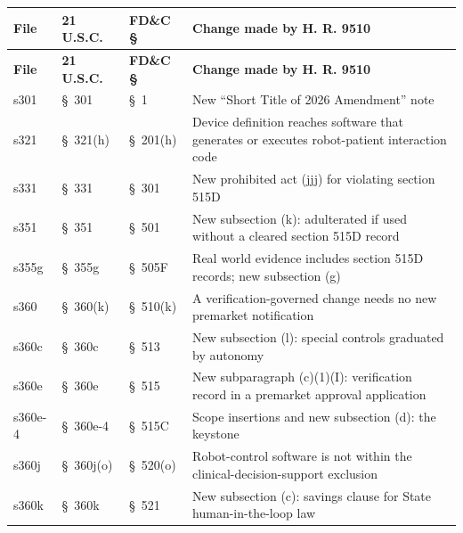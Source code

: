 {\footnotesize
\begin{xltabular}{\textwidth}{@{}L{1.4cm} L{1.7cm} L{1.5cm} Y@{}}
\hline
\textbf{File} & \textbf{21 U.S.C.} & \textbf{FD\&C \S} & \textbf{Change made by
H. R. 9510}\\
\hline
\endfirsthead
\hline
\textbf{File} & \textbf{21 U.S.C.} & \textbf{FD\&C \S} & \textbf{Change made by
H. R. 9510}\\
\hline
\endhead
\hline
\endlastfoot
s301 & \S~301 & \S~1 & New ``Short Title of 2026 Amendment'' note\\
\hline
s321 & \S~321(h) & \S~201(h) & Device definition reaches software that generates
or executes robot-patient interaction code\\
\hline
s331 & \S~331 & \S~301 & New prohibited act (jjj) for violating section 515D\\
\hline
s351 & \S~351 & \S~501 & New subsection (k): adulterated if used without a cleared
section 515D record\\
\hline
s355g & \S~355g & \S~505F & Real world evidence includes section 515D records; new
subsection (g)\\
\hline
s360 & \S~360(k) & \S~510(k) & A verification-governed change needs no new
premarket notification\\
\hline
s360c & \S~360c & \S~513 & New subsection (l): special controls graduated by
autonomy\\
\hline
s360e & \S~360e & \S~515 & New subparagraph (c)(1)(I): verification record in a
premarket approval application\\
\hline
s360e-4 & \S~360e-4 & \S~515C & Scope insertions and new subsection (d): the
keystone\\
\hline
s360j & \S~360j(o) & \S~520(o) & Robot-control software is not within the
clinical-decision-support exclusion\\
\hline
s360k & \S~360k & \S~521 & New subsection (c): savings clause for State
human-in-the-loop law\\
\hline
\end{xltabular}}

